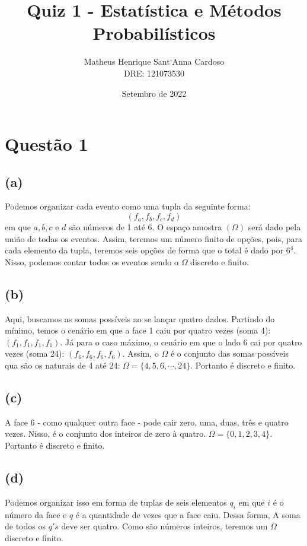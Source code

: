 \documentclass{article}
\title{Quiz 1 - Estatística e Métodos Probabilísticos}
\author{Matheus Henrique Sant`Anna Cardoso\\
        DRE: 121073530        
}
\date{Setembro de 2022}
\begin{document}
    
\maketitle

\section*{Questão 1}

\subsection*{(a)}
Podemos organizar cada evento como uma tupla da seguinte forma:
\[(f_{a}, f_{b}, f_{c}, f_{d})\]
em que $a, b, c$ e $d$ são números de 1 até 6.
O espaço amostra $(\Omega)$ será dado pela união de todas os eventos. Assim, teremos um número finito de opções, pois, para cada elemento da tupla, teremos seis opções de forma que o total é dado por $6^4$. Nisso, podemos contar todos os eventos sendo o $\Omega$ discreto e finito.

\subsection*{(b)}
Aqui, buscamos as somas possíveis ao se lançar quatro dados. Partindo do mínimo, temos o cenário em que a face 1 caiu por quatro vezes (soma 4): $(f_{1}, f_{1}, f_{1}, f_{1})$. Já para o caso máximo, o cenário em que o lado 6 cai por quatro vezes (soma 24): $(f_{6}, f_{6}, f_{6}, f_{6})$. Assim, o $\Omega$ é o conjunto das somas possíveis qua são os naturais de 4 até 24: $\Omega = \{4, 5, 6, \cdots, 24\}$. Portanto é discreto e finito.

\subsection*{(c)}
A face 6 - como qualquer outra face - pode cair zero, uma, duas, três e quatro vezes. Nisso, é o conjunto dos inteiros de zero à quatro. $\Omega = \{0, 1, 2, 3, 4\}$. Portanto é discreto e finito.

\subsection*{(d)}
Podemos organizar isso em forma de tuplas de seis elementos $q_{i}$ em que $i$ é o número da face e $q$ é a quantidade de vezes que a face caiu. Dessa forma, A soma de todos os $q's$ deve ser quatro. Como são números inteiros, teremos um $\Omega$ discreto e finito.
\end{document}
